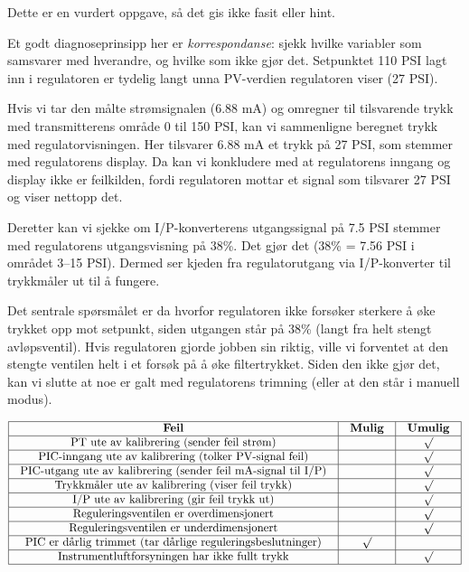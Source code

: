 
Dette er en vurdert oppgave, så det gis ikke fasit eller hint.







Et godt diagnoseprinsipp her er \textit{korrespondanse}: sjekk hvilke variabler som samsvarer med hverandre, og hvilke som ikke gjør det. Setpunktet 110 PSI lagt inn i regulatoren er tydelig langt unna PV-verdien regulatoren viser (27 PSI).

Hvis vi tar den målte strømsignalen (6.88 mA) og omregner til tilsvarende trykk med transmitterens område 0 til 150 PSI, kan vi sammenligne beregnet trykk med regulatorvisningen. Her tilsvarer 6.88 mA et trykk på 27 PSI, som stemmer med regulatorens display. Da kan vi konkludere med at regulatorens inngang og display ikke er feilkilden, fordi regulatoren mottar et signal som tilsvarer 27 PSI og viser nettopp det.

Deretter kan vi sjekke om I/P-konverterens utgangssignal på 7.5 PSI stemmer med regulatorens utgangsvisning på 38\%. Det gjør det (38\% = 7.56 PSI i området 3--15 PSI). Dermed ser kjeden fra regulatorutgang via I/P-konverter til trykkmåler ut til å fungere.

Det sentrale spørsmålet er da hvorfor regulatoren ikke forsøker sterkere å øke trykket opp mot setpunkt, siden utgangen står på 38\% (langt fra helt stengt avløpsventil). Hvis regulatoren gjorde jobben sin riktig, ville vi forventet at den stengte ventilen helt i et forsøk på å øke filtertrykket. Siden den ikke gjør det, kan vi slutte at noe er galt med regulatorens trimning (eller at den står i manuell modus).



$$\vbox{\offinterlineskip
\halign{\strut
\vrule \quad\hfil # \ \hfil & 
\vrule \quad\hfil # \ \hfil & 
\vrule \quad\hfil # \ \hfil \vrule \cr
\noalign{\hrule}
%
{\bf Feil} & {\bf Mulig} & {\bf Umulig} \cr
%
\noalign{\hrule}
%
PT ute av kalibrering (sender feil strøm) &  & $\surd$ \cr
%
\noalign{\hrule}
%
PIC-inngang ute av kalibrering (tolker PV-signal feil) &  & $\surd$ \cr
%
\noalign{\hrule}
%
PIC-utgang ute av kalibrering (sender feil mA-signal til I/P) &  & $\surd$ \cr
%
\noalign{\hrule}
%
Trykkmåler ute av kalibrering (viser feil trykk) &  & $\surd$ \cr
%
\noalign{\hrule}
%
I/P ute av kalibrering (gir feil trykk ut) &  & $\surd$ \cr
%
\noalign{\hrule}
%
Reguleringsventilen er overdimensjonert &  & $\surd$ \cr
%
\noalign{\hrule}
%
Reguleringsventilen er underdimensjonert &  & $\surd$ \cr
%
\noalign{\hrule}
%
PIC er dårlig trimmet (tar dårlige reguleringsbeslutninger) & $\surd$ &  \cr
%
\noalign{\hrule}
%
Instrumentluftforsyningen har ikke fullt trykk &  & $\surd$ \cr
%
\noalign{\hrule}
} %
}$$ %


